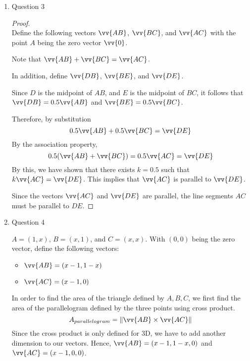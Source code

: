 \documentclass[11pt]{article}
\def\R {{\mathbb R}}
\begin{document}
\begin{enumerate}
\begin{enumerate}
\begin{proof}
        Now assume that $l_1$ and $l_2$ are parallel to each other. Then $\vv{a}$ must be parallel to $\vv{b}$. By property of vector, $\vv{a}=k\vv{b}$ for some $k\in\R$.
        
        By definition of $\vv{a}$ and $\vv{b}$,
        $$
        (x_2-x_1, m(x_2-x_1)) = k(x_4-x_3, n(x_4-x_3))
        $$
        Then, we can have the following system of equations:
        $$
        \begin{cases}
        x_2-x_1 = k(x_4-x_3) \\
        m(x_2-x_1) = kn(x_4-x_3)
        \end{cases}
        $$
        Substituting the first equation into the second one gives $m=n$.
        \end{proof}
    \end{enumerate}
    
    \item Question 3
    \hfill
    \begin{proof}
    \hfill \\
    Define the following vectors $\vv{AB}$, $\vv{BC}$, and $\vv{AC}$ with the point $A$ being the zero vector $\vv{0}$.
    
    Note that $\vv{AB}+\vv{BC} = \vv{AC}$.
    
    In addition, define $\vv{DB}$, $\vv{BE}$, and $\vv{DE}$.
    
    Since $D$ is the midpoint of $AB$, and $E$ is the midpoint of $BC$, it follows that $\vv{DB} = 0.5 \vv{AB}$ and $\vv{BE} = 0.5 \vv{BC}$.
    
    Therefore, by substitution
    $$
    0.5\vv{AB} + 0.5\vv{BC} = \vv{DE}
    $$
    By the association property,
    $$
    0.5(\vv{AB}+\vv{BC}) = 0.5 \vv{AC} = \vv{DE}
    $$
    By this, we have shown that there exists $k = 0.5$ such that $k \vv{AC} = \vv{DE}$. This implies that $\vv{AC}$ is parallel to $\vv{DE}$.
    
    Since the vectors $\vv{AC}$ and $\vv{DE}$ are parallel, the line segments $AC$ must be parallel to $DE$.
    \end{proof}
    
    \item Question 4
    
    $A=(1,x)$, $B=(x,1)$, and $C=(x,x)$. With $(0,0)$ being the zero vector, define the following vectors:
    \begin{itemize}
        \item $\vv{AB}=(x-1,1-x)$
        \item $\vv{AC}=(x-1,0)$
    \end{itemize}
    In order to find the area of the triangle defined by $A,B,C$, we first find the area of the parallelogram defined by the three points using cross product.
    $$
    A_{parallelogram} = \lVert \vv{AB} \times \vv{AC} \rVert
    $$
    Since the cross product is only defined for 3D, we have to add another dimension to our vectors. Hence, $\vv{AB}=(x-1,1-x,0)$ and $\vv{AC}=(x-1,0,0)$.
    

\end{enumerate}
\end{document}
